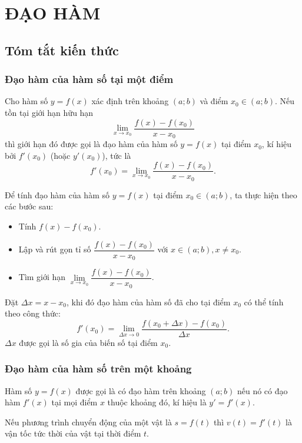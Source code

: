 \setcounter{section}{30}
\section{ĐẠO HÀM}
\subsection{Tóm tắt kiến thức}
\begin{tomtat}
	\subsubsection{Đạo hàm của hàm số tại một điểm}
	\begin{dn}
	Cho hàm số $y=f(x)$ xác định trên khoảng $(a;b)$ và điểm $x_0 \in (a;b)$.
	Nếu tồn tại giới hạn hữu hạn 
	\[\lim\limits_{x \to x_0} \dfrac{f(x)-f(x_0)}{x-x_0}\]
	thì giới hạn đó được gọi là đạo hàm của hàm số $y=f(x)$ tại điểm $x_0$, kí hiệu bởi $f'(x_0)$ (hoặc $y'(x_0)$), tức là 
	\[f'(x_0)=\lim\limits_{x \to x_0} \dfrac{f(x)-f(x_0)}{x-x_0}.\]
	\end{dn}
	\begin{note}
	Để tính đạo hàm của hàm số $y=f(x)$ tại điểm $x_0\in (a;b)$, ta thực hiện theo các bước sau:
	\begin{itemize}
	\item Tính $f(x)-f(x_0)$.
	\item Lập và rút gọn tỉ số $\dfrac{f(x)-f(x_0)}{x-x_0}$ với $x \in (a;b),x \ne x_0$.
	\item Tìm giới hạn $\lim\limits_{x \to x_0} \dfrac{f(x)-f(x_0)}{x-x_0}$.
	\end{itemize}
	\end{note}
	\begin{note}
	Đặt $\Delta x=x-x_0$, khi đó đạo hàm của hàm số đã cho tại điểm $x_0$ có thể tính theo công thức:\\
	$$f'(x_0)=\lim\limits_{\Delta x \to 0} \dfrac{f(x_0+\Delta x)-f(x_0)}{\Delta x}.$$
	$\Delta x$ được gọi là số gia của biến số tại điểm $x_0$.
	\end{note}
	\subsubsection{Đạo hàm của hàm số trên một khoảng}
	\begin{dn}
	Hàm số $y=f(x)$ được gọi là có đạo hàm trên khoảng $(a;b)$ nếu nó có đạo hàm $f'(x)$ tại mọi điểm $x$ thuộc khoảng đó, kí hiệu là $y'=f'(x)$.
	\end{dn}	
	\begin{note}
	Nếu phương trình chuyển động của một vật là $s=f(t)$ thì $v(t)=f'(t)$ là vận tốc tức thời của vật tại thời điểm $t$.
	\end{note}

\end{tomtat}
